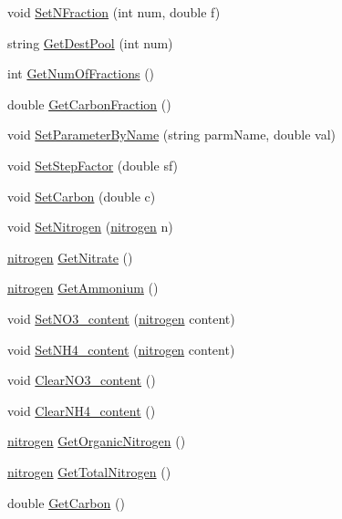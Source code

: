 \begin{DoxyCompactItemize}
void \hyperlink{classorganic_product_a3442bd238770ac98b17b88b6a7939a51}{SetNFraction} (int num, double f)
\item 
string \hyperlink{classorganic_product_a819eb78c2c6ed351bdfc27264ea74281}{GetDestPool} (int num)
\item 
int \hyperlink{classorganic_product_a8901cf7bada2bbba03698a61ba213ea4}{GetNumOfFractions} ()
\item 
double \hyperlink{classorganic_product_a9d4c5ab06266e32de73559d1b80a47ac}{GetCarbonFraction} ()
\item 
void \hyperlink{classorganic_product_aad6b0a71fb2db562996e41d9e169c7ca}{SetParameterByName} (string parmName, double val)
\item 
void \hyperlink{classorganic_product_af925a90ee49c9f5ec1ab117ab4de0405}{SetStepFactor} (double sf)
\item 
void \hyperlink{classorganic_product_aed3ff10d5be6bddf62a64e3107d56d2c}{SetCarbon} (double c)
\item 
void \hyperlink{classorganic_product_a1da1b32c1a68a787fade1b1f6af1a85e}{SetNitrogen} (\hyperlink{classnitrogen}{nitrogen} n)
\item 
\hyperlink{classnitrogen}{nitrogen} \hyperlink{classorganic_product_a0802b95a06c9487102b3f8c1852f683a}{GetNitrate} ()
\item 
\hyperlink{classnitrogen}{nitrogen} \hyperlink{classorganic_product_a40c6ff10538b07cc1dcd0a9d55bb2b6e}{GetAmmonium} ()
\item 
void \hyperlink{classorganic_product_ae2618cd8eb23583035214d37cb4fbe0f}{SetNO3\_\-content} (\hyperlink{classnitrogen}{nitrogen} content)
\item 
void \hyperlink{classorganic_product_a62634111037a6e2961c7c042d6773038}{SetNH4\_\-content} (\hyperlink{classnitrogen}{nitrogen} content)
\item 
void \hyperlink{classorganic_product_a6068cca47d8fb9b69fa3f5ebdc4de374}{ClearNO3\_\-content} ()
\item 
void \hyperlink{classorganic_product_a8717b1f12853806f7e4290e6df1db63d}{ClearNH4\_\-content} ()
\item 
\hyperlink{classnitrogen}{nitrogen} \hyperlink{classorganic_product_a8e2346d9fb4a3309b32ae90548142246}{GetOrganicNitrogen} ()
\item 
\hyperlink{classnitrogen}{nitrogen} \hyperlink{classorganic_product_aba7720784ab3cc2e672d2659085b3950}{GetTotalNitrogen} ()
\item 
double \hyperlink{classorganic_product_a7a513aeab6d52db777468be459631919}{GetCarbon} ()

\end{DoxyCompactItemize}
